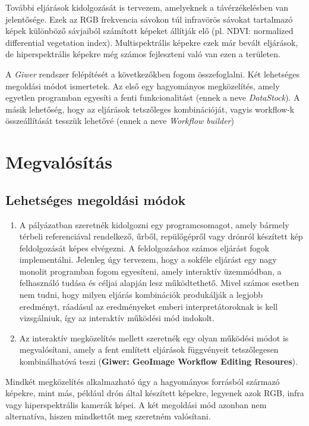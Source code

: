 \documentclass[a4paper,12pt]{article}
\begin{document}
További eljárások kidolgozását is tervezem, amelyeknek a távérzékelésben van jelentősége. Ezek az RGB frekvencia sávokon túl infravörös sávokat tartalmazó képek különböző sávjaiból számított képeket állítják elő (pl. NDVI: normalized differential vegetation index). Multispektrális képekre ezek már bevált eljárások, de hiperspektrális képekre még számos fejleszteni való van ezen a területen.

A \textit{Giwer} rendszer felépítését a következőkben fogom összefoglalni. Két lehetséges megoldási módot ismertetek. Az első egy hagyományos megközelítés, amely egyetlen programban egyesíti a fenti funkcionalitást (ennek a neve \textit{DataStock}). A másik lehetőség, hogy az eljárások tetszőleges kombinációját, vagyis workflow-k összeállítását tesszük lehetővé (ennek a neve \textit{Workflow builder})

\section{Megvalósítás}

\subsection{Lehetséges megoldási módok}

\begin{enumerate}
	\item A pályázatban szeretnék kidolgozni egy programcsomagot, amely bármely  térbeli referenciával rendelkező, űrből, repülőgépről vagy drónról készített kép feldolgozását képes elvégezni. A feldolgozáshoz számos eljárást fogok implementálni. Jelenleg úgy tervezem, hogy a sokféle eljárást egy nagy monolit programban fogom egyesíteni, amely interaktív üzemmódban, a felhasználó tudása és céljai alapján lesz működtethető. Mivel számos esetben nem tudni, hogy milyen eljárás kombinációk produkálják a legjobb eredményt, ráadásul az eredményeket emberi interpretátoroknak is kell vizsgálniuk, így az interaktív működési mód indokolt.
	
	\item Az interaktív megközelítés mellett szeretnék egy olyan működési módot is megvalósítani, amely a fent említett eljárások függvényeit tetszőlegesen kombinálhatóvá teszi (\textbf{Giwer: GeoImage Workflow Editing Resoures}).  
\end{enumerate}

Mindkét megközelítés alkalmazható úgy a hagyományos forrásból származó képekre, mint más, például drón által készített képekre, legyenek azok RGB, infra vagy hiperspektrális kamerák képei. A két megoldási mód azonban nem alternatíva, hiszen mindkettőt meg szeretném valósítani.
\end{document}
